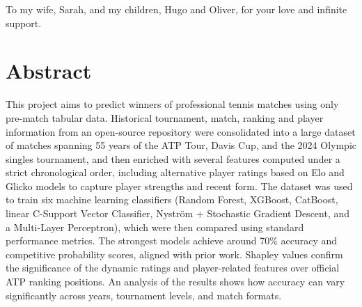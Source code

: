 To my wife, Sarah, and my children, Hugo and Oliver, for your love and infinite support.


\pagebreak


\section*{Abstract}

This project aims to predict winners of professional tennis matches using only pre-match tabular
data. Historical tournament, match, ranking and player information from an open-source repository
were consolidated into a large dataset of matches spanning 55 years of the ATP Tour, Davis Cup, and
the 2024 Olympic singles tournament, and then enriched with several features computed under a strict
chronological order, including alternative player ratings based on Elo and Glicko models to capture
player strengths and recent form. The dataset was used to train six machine learning classifiers
(Random Forest, XGBoost, CatBoost, linear C-Support Vector Classifier, Nyström + Stochastic Gradient
Descent, and a Multi-Layer Perceptron), which
were then compared using standard performance metrics. The strongest models achieve around 70\%
accuracy and competitive probability scores, aligned with prior work. Shapley values confirm the
significance of the dynamic ratings and player-related features over official ATP ranking positions.
An analysis of the results shows how accuracy can vary significantly across years, tournament levels,
and match formats.



\pagebreak


\tableofcontents


\pagebreak


